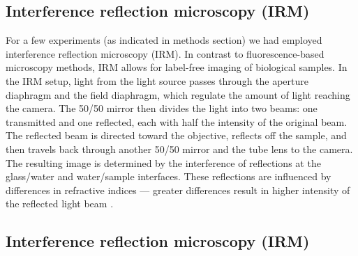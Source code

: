 \subsection{Interference reflection microscopy (IRM)}
For a few experiments (as indicated in methods section) we had employed interference reflection microscopy (IRM). In contrast to fluorescence-based microscopy methods, IRM allows for label-free imaging of biological samples. In the IRM setup, light from the light source passes through the aperture diaphragm and the field diaphragm, which regulate the amount of light reaching the camera. The 50/50 mirror then divides the light into two beams: one transmitted and one reflected, each with half the intensity of the original beam. The reflected beam is directed toward the objective, reflects off the sample, and then travels back through another 50/50 mirror and the tube lens to the camera. The resulting image is determined by the interference of reflections at the glass/water and water/sample interfaces. These reflections are influenced by differences in refractive indices — greater differences result in higher intensity of the reflected light beam \parencite{barr2009interference}.

\subsection{Interference reflection microscopy (IRM)}
